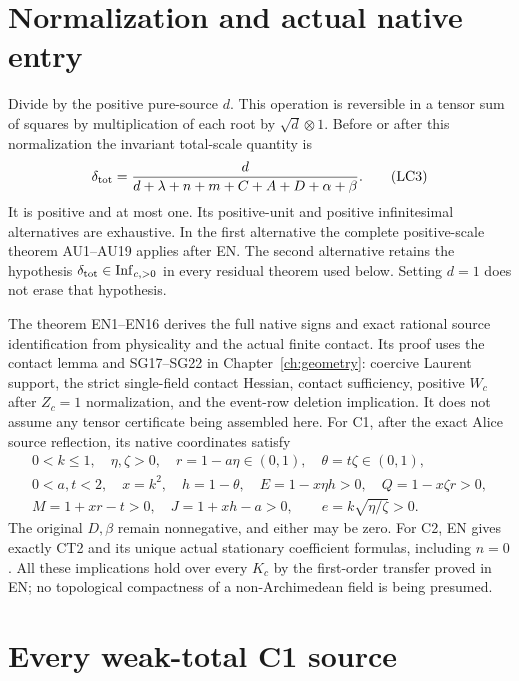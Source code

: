 \section{Normalization and actual native entry}

Divide by the positive pure-source \(d\).  This operation is reversible
in a tensor sum of squares by multiplication of each root by
\(\sqrt d\otimes1\).  Before or after this normalization the invariant
total-scale quantity is
\[
 \delta_{\rm tot}
  =\frac d{d+\lambda+n+m+C+A+D+\alpha+\beta}.
\tag{LC3}
\]
It is positive and at most one.  Its positive-unit and positive
infinitesimal alternatives are exhaustive.  In the first alternative
the complete positive-scale theorem AU1--AU19 applies after EN.
The second alternative retains the hypothesis
\(\delta_{\rm tot}\in\mathrm{Inf}_{c,>0}\) in every residual theorem
used below.  Setting \(d=1\) does not erase that hypothesis.

The theorem EN1--EN16 derives the full native signs and exact rational
source identification from physicality and the actual finite contact.
Its proof uses the contact lemma and SG17--SG22 in Chapter~\ref{ch:geometry}: coercive Laurent support, the strict single-field contact Hessian, contact sufficiency, positive $W_c$ after $Z_c=1$ normalization, and the event-row deletion implication.
It does not assume any tensor certificate being assembled here.
For C1, after the exact Alice source reflection, its native coordinates
satisfy
\[
\begin{gathered}
 0<k\leq1,\quad \eta,\zeta>0,\quad
 r=1-a\eta\in(0,1),\quad \theta=t\zeta\in(0,1),\\
 0<a,t<2,\quad x=k^2,\quad h=1-\theta,\quad
 E=1-x\eta h>0,\quad Q=1-x\zeta r>0,\\
 M=1+xr-t>0,\quad J=1+xh-a>0,\qquad
 e=k\sqrt{\eta/\zeta}>0 .
\end{gathered}\tag{LC4}
\]
The original \(D,\beta\) remain nonnegative, and either may be zero.
For C2, EN gives exactly CT2 and its unique actual stationary
coefficient formulas, including \(n=0\).
All these implications hold over every \(K_c\) by the first-order
transfer proved in EN; no topological compactness of a
non-Archimedean field is being presumed.

\section{Every weak-total C1 source}

